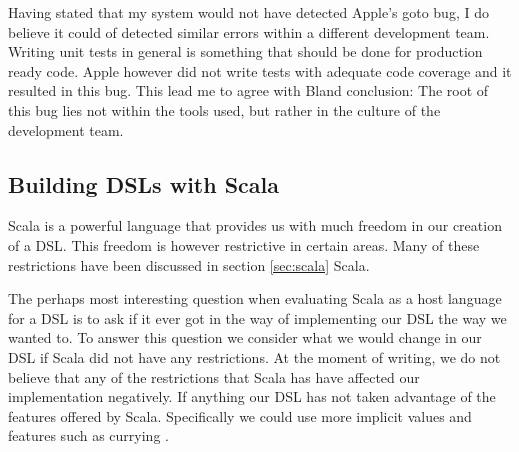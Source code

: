 
Having stated that my system would not have detected Apple's goto bug, I do believe it could of detected similar errors within a different development team. Writing unit tests in general is something that should be done for production ready code. Apple however did not write tests with adequate code coverage and it resulted in this bug. This lead me to agree with Bland conclusion: The root of this bug lies not within the tools used, but rather in the culture of the development team.

\iffalse
\subsubsection{Heartbleed}
Heartbleed\footnote{\href{http://heartbleed.com/}{Heartbleed's Homepage}} was a weakness discovered within the OpenSSL library that would allow for attackers to read the main memory of a system. OpenSSL is an open source cryptographic library for implementing the Secure Socket Layer (SSL) and Transport Layer Security (TLS). It is used by web servers such as Apache and nginx. Data from a web survey\footnote{http://news.netcraft.com/archives/2014/04/02/april-2014-web-server-survey.html}{Netcraft's Web survey}} conducted by Netcraft in 2014, determined that their combined market share was above 60\% when the bug was discovered.

Heartbleed was such a devastating bug as it was a very simple attack, left no traces of an attack and it was a widespread vulnerability. 
\fi


\subsection{Building DSLs with Scala}
Scala is a powerful language that provides us with much freedom in our creation of a DSL. This freedom is however restrictive in certain areas. Many of these restrictions have been discussed in section \ref{sec:scala} Scala.
 
The perhaps most interesting question when evaluating Scala as a host language for a DSL is to ask if it ever got in the way of implementing our DSL the way we wanted to. To answer this question we consider what we would change in our DSL if Scala did not have any restrictions. At the moment of writing, we do not believe that any of the restrictions that Scala has have affected our implementation negatively. If anything our DSL has not taken advantage of the features offered by Scala. Specifically we could use more implicit values and features such as currying \cite{odersky2008programming}. 


